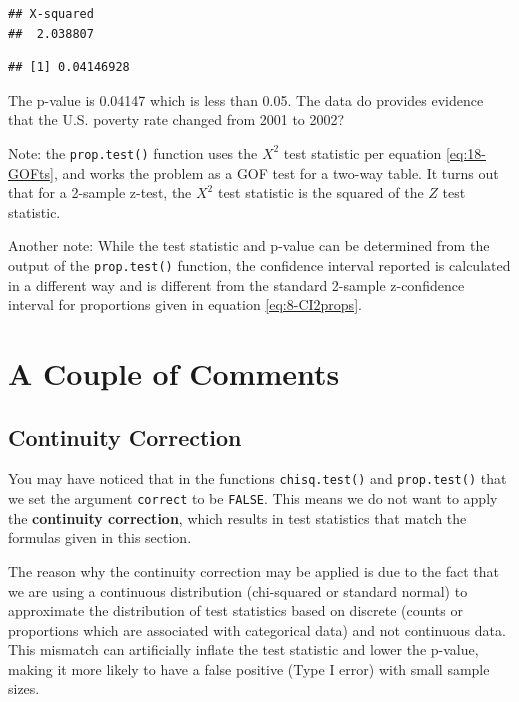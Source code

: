 \documentclass[
]{book}
\newenvironment{Shaded}{\begin{snugshade}}{\end{snugshade}}
\newcommand{\NormalTok}[1]{#1}
\newcommand{\SpecialCharTok}[1]{\textcolor[rgb]{0.81,0.36,0.00}{\textbf{#1}}}
\theoremstyle{definition}
\theoremstyle{definition}
\theoremstyle{definition}
\theoremstyle{definition}
\theoremstyle{remark}
\begin{document}
\begin{verbatim}
## X-squared 
##  2.038807
\end{verbatim}

\begin{Shaded}
\end{Shaded}

\begin{verbatim}
## [1] 0.04146928
\end{verbatim}

The p-value is 0.04147 which is less than 0.05. The data do provides evidence that the U.S. poverty rate changed from 2001 to 2002?

Note: the \texttt{prop.test()} function uses the \(X^2\) test statistic per equation \eqref{eq:18-GOFts}, and works the problem as a GOF test for a two-way table. It turns out that for a 2-sample z-test, the \(X^2\) test statistic is the squared of the \(Z\) test statistic.

Another note: While the test statistic and p-value can be determined from the output of the \texttt{prop.test()} function, the confidence interval reported is calculated in a different way and is different from the standard 2-sample z-confidence interval for proportions given in equation \eqref{eq:8-CI2props}.

\hypertarget{a-couple-of-comments}{%
\section{A Couple of Comments}\label{a-couple-of-comments}}

\hypertarget{continuity-correction}{%
\subsection{Continuity Correction}\label{continuity-correction}}

You may have noticed that in the functions \texttt{chisq.test()} and \texttt{prop.test()} that we set the argument \texttt{correct} to be \texttt{FALSE}. This means we do not want to apply the \textbf{continuity correction}, which results in test statistics that match the formulas given in this section.

The reason why the continuity correction may be applied is due to the fact that we are using a continuous distribution (chi-squared or standard normal) to approximate the distribution of test statistics based on discrete (counts or proportions which are associated with categorical data) and not continuous data. This mismatch can artificially inflate the test statistic and lower the p-value, making it more likely to have a false positive (Type I error) with small sample sizes.
\end{document}
